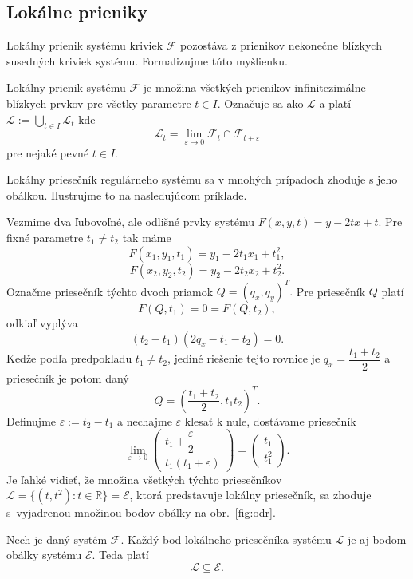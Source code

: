 \subsection{Lokálne prieniky} \label{lokalne prieniky pre krivky}
Lokálny prienik systému kriviek $\mathcal{F} $ pozostáva z prienikov nekonečne blízkych susedných kriviek systému. Formalizujme túto myšlienku.
\begin{definition} \label{def:lokalny prienik}
Lokálny prienik systému $\mathcal{F}$ je množina všetkých prienikov infinitezimálne blízkych prvkov pre všetky parametre $t \in I$. Označuje sa ako $\mathcal{L}$ a platí
$
\mathcal{L} := \bigcup_{t \in I} \mathcal{L}_{t}
$ kde
$$
\mathcal{L}_{t} = \lim_{\varepsilon \to 0} \mathcal{F}_{t} \cap \mathcal{F}_{t + \varepsilon}
$$
pre nejaké pevné $t \in I.$
\end{definition}
Lokálny priesečník regulárneho systému sa v mnohých prípadoch zhoduje s jeho obálkou. Ilustrujme to na nasledujúcom príklade.

\begin{example}
Vezmime dva ľubovoľné, ale odlišné prvky systému $F(x, y, t) = y - 2tx + t.$
Pre fixné parametre $t_1 \neq t_2$ tak máme
$$F(x_1, y_1, t_1) = y_1 - 2t_1x_1 + t_1^2,$$
$$F(x_2, y_2, t_2) = y_2 - 2t_2x_2 + t_2^2.$$ 
Označme priesečník týchto dvoch priamok $Q = (q_x, q_y)^T.$ Pre priesečník $Q$ platí $$F(Q, t_1) = 0 = F(Q, t_2),$$ odkiaľ vyplýva 
$$(t_2 - t_1)(2q_x - t_1 - t_2) = 0.$$ 
Keďže podľa predpokladu $t_1 \neq t_2$, jediné riešenie tejto rovnice je $q_x = \dfrac{t_1 + t_2}{2}$ a priesečník je potom daný 
$$Q = \left(\dfrac{t_1 + t_2}{2}, t_1t_2\right)^T.$$ Definujme $\varepsilon := t_2 - t_1$ a nechajme $\varepsilon$ klesať k nule, dostávame priesečník
$$
\lim_{\varepsilon \to 0} 
\begin{pmatrix} 
t_1 + \dfrac{\varepsilon}{2} \\
t_1(t_1 + \varepsilon)
\end{pmatrix} = \begin{pmatrix} 
t_1 \\
t_1^2
\end{pmatrix}.
$$
Je ľahké vidieť, že množina všetkých týchto priesečníkov $\mathcal{L} = \{(t, t^2): t \in \mathbb{R}\} = \mathcal{E}$, ktorá predstavuje lokálny priesečník, sa zhoduje s~vyjadrenou množinou bodov obálky na obr.~\ref{fig:odr}.
\end{example}

\begin{corollary} Nech je daný systém $\mathcal{F}$. Každý bod lokálneho priesečníka systému $\mathcal{L}$ je aj bodom obálky systému $\mathcal{E}$. Teda platí
$$ \mathcal{L} \subseteq \mathcal{E}. $$
\end{corollary}

